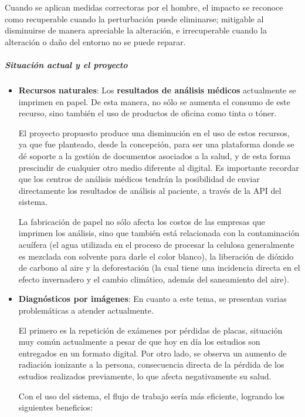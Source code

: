 Cuando  se  aplican  medidas  correctoras  por  el  hombre,  el  impacto  se  reconoce  como recuperable cuando la perturbación puede eliminarse; mitigable al disminuirse de manera apreciable la alteración, e irrecuperable cuando la alteración o daño del entorno no se puede reparar.


{\correccionTexto
\subparagraph{Situación actual y el proyecto}

\begin{itemize}
    
    \item \textbf{Recursos naturales}:
    Los \textbf{resultados de análisis médicos} actualmente se imprimen en papel.
    De esta manera, no sólo se aumenta el consumo de este recurso, sino también el uso de productos de oficina como tinta o tóner.
    
    El proyecto propuesto produce una disminución en el uso de estos recursos, ya que fue planteado, desde la concepción, para ser una plataforma donde se dé soporte a la gestión de documentos asociados a la salud, y de esta forma prescindir de cualquier otro medio diferente al digital.
    Es importante recordar que los centros de análisis médicos tendrán la posibilidad de enviar directamente los resultados de análisis al paciente, a través de la API del sistema.

    La fabricación de papel no sólo afecta los costos de las empresas que imprimen los análisis, sino que también está relacionada con la contaminación acuífera (el agua utilizada en el proceso de procesar la celulosa generalmente es mezclada con solvente para darle el color blanco), la liberación de dióxido de carbono al aire y la deforestación (la cual tiene una incidencia directa en el efecto invernadero y el cambio climático, además del saneamiento del aire).

    \item \textbf{Diagnósticos por imágenes}:
    En cuanto a este tema, se presentan varias problemáticas a atender actualmente.
    
    El primero es la repetición de exámenes por pérdidas de placas, situación muy común actualmente a pesar de que hoy en día los estudios son entregados en un formato digital.
    Por otro lado, se observa un aumento de radiación ionizante a la persona, consecuencia directa de la pérdida de los estudios realizados previamente, lo que afecta negativamente su salud.
    
    Con el uso del sistema, el flujo de trabajo sería más eficiente, logrando los siguientes beneficios:
    

\end{itemize}}
